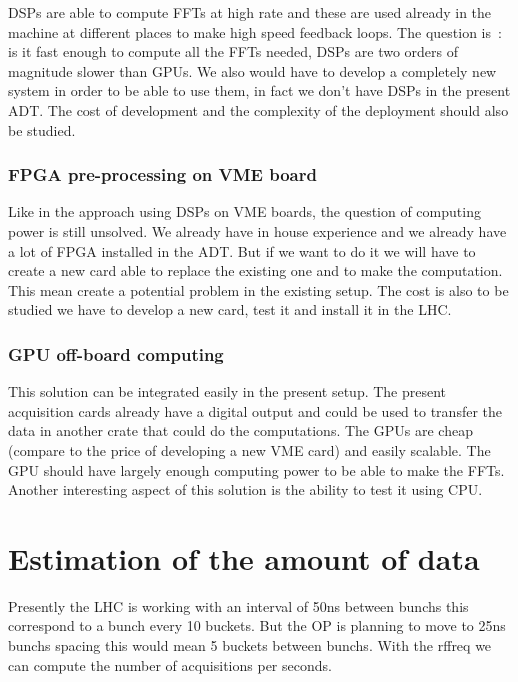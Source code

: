 \documentclass[a4paper]{article}
\begin{document}
\Glspl{DSP} are able to compute \glspl{FFT} at high rate and these are used
already in the machine at different places to make high speed feedback loops.
The question is~: is it fast enough to compute all the \glspl{FFT} needed, 
\glspl{DSP} are two orders of magnitude slower than \glspl{GPU}. We also 
would have to develop a completely new system in order to be able to use them, 
in fact we don't have \glspl{DSP} in the present \gls{ADT}. The cost of 
development and the complexity of the deployment should also be studied.

\subsubsection{FPGA pre-processing on VME board}

Like in the approach using \glspl{DSP} on VME boards, the question of computing 
power is still unsolved. We already have in house experience and we already 
have a lot of \gls{FPGA} installed in the \gls{ADT}. But if we want to do it we 
will have to create a new card able to replace the existing one and to make the 
computation. This mean create a potential problem in the existing setup. The 
cost is also to be studied we have to develop a new card, test it and install 
it in the \gls{LHC}.

\subsubsection{GPU off-board computing}

This solution can be integrated easily in the present setup. The present 
acquisition cards already have a digital output and could be used to transfer
the data in another crate that could do the computations. The \glspl{GPU} are
cheap (compare to the price of developing a new \gls{VME} card) and easily
scalable. The \gls{GPU} should have largely enough computing power to be able
to make the \glspl{FFT}. Another interesting aspect of this solution is the 
ability to test it using \gls{CPU}.

\section{Estimation of the amount of data}

Presently the \gls{LHC} is working with an interval of 50ns between 
\glspl{bunch} this correspond to a bunch every 10 \glspl{bucket}. But the 
\gls{OP} is planning to move to 25ns \glspl{bunch} spacing this would mean 
5 \glspl{bucket} between \glspl{bunch}. With the \gls{rffreq} we can compute 
the number of acquisitions per seconds.
\end{document}
